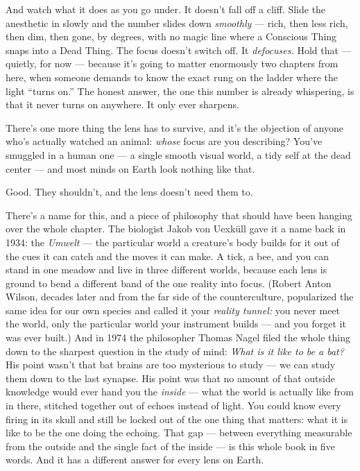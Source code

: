 \documentclass[11pt,openany]{book}
\begin{document}
And watch what it does as you go under. It doesn’t fall off a cliff. Slide the anesthetic in slowly and the number slides down \textit{smoothly} — rich, then less rich, then dim, then gone, by degrees, with no magic line where a Conscious Thing snaps into a Dead Thing. The focus doesn’t switch off. It \textit{defocuses.} Hold that — quietly, for now — because it’s going to matter enormously two chapters from here, when someone demands to know the exact rung on the ladder where the light “turns on.” The honest answer, the one this number is already whispering, is that it never turns on anywhere. It only ever sharpens.

There’s one more thing the lens has to survive, and it’s the objection of anyone who’s actually watched an animal: \textit{whose} focus are you describing? You’ve smuggled in a human one — a single smooth visual world, a tidy self at the dead center — and most minds on Earth look nothing like that.

Good. They shouldn’t, and the lens doesn’t need them to.

There’s a name for this, and a piece of philosophy that should have been hanging over the whole chapter. The biologist Jakob von Uexküll gave it a name back in 1934: the \textit{Umwelt} — the particular world a creature’s body builds for it out of the cues it can catch and the moves it can make. A tick, a bee, and you can stand in one meadow and live in three different worlds, because each lens is ground to bend a different band of the one reality into focus. (Robert Anton Wilson, decades later and from the far side of the counterculture, popularized the same idea for our own species and called it your \textit{reality tunnel:} you never meet the world, only the particular world your instrument builds — and you forget it was ever built.) And in 1974 the philosopher Thomas Nagel filed the whole thing down to the sharpest question in the study of mind: \textit{What is it like to be a bat?} His point wasn’t that bat brains are too mysterious to study — we can study them down to the last synapse. His point was that no amount of that outside knowledge would ever hand you the \textit{inside} — what the world is actually like from in there, stitched together out of echoes instead of light. You could know every firing in its skull and still be locked out of the one thing that matters: what it is like to be the one doing the echoing. That gap — between everything measurable from the outside and the single fact of the inside — is this whole book in five words. And it has a different answer for every lens on Earth.
\end{document}
